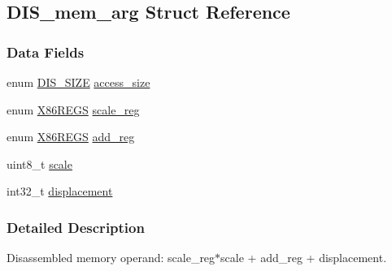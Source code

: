 \hypertarget{struct_d_i_s__mem__arg}{\subsection{D\-I\-S\-\_\-mem\-\_\-arg Struct Reference}
\label{struct_d_i_s__mem__arg}
}
\subsubsection*{Data Fields}
\begin{DoxyCompactItemize}
\item 
enum \hyperlink{bytecode__disasm_8h_a6a0d419b6b61630b1f76a25ff39df84d}{D\-I\-S\-\_\-\-S\-I\-Z\-E} \hyperlink{struct_d_i_s__mem__arg_abe85ed51a3596cdb3a868a284c3d961f}{access\-\_\-size}
\item 
enum \hyperlink{bytecode__disasm_8h_a87af2e927a80478796188d9d8d813d82}{X86\-R\-E\-G\-S} \hyperlink{struct_d_i_s__mem__arg_afb3d2d6aee6f877fd62b8ffc576d9351}{scale\-\_\-reg}
\item 
enum \hyperlink{bytecode__disasm_8h_a87af2e927a80478796188d9d8d813d82}{X86\-R\-E\-G\-S} \hyperlink{struct_d_i_s__mem__arg_abdbd08c3d265ff494ad5ff1006cc6a73}{add\-\_\-reg}
\item 
uint8\-\_\-t \hyperlink{struct_d_i_s__mem__arg_a616c0a72f0e4af38b93c736773ac7210}{scale}
\item 
int32\-\_\-t \hyperlink{struct_d_i_s__mem__arg_a241d2c58aca95f8589148d4acf97406d}{displacement}
\end{DoxyCompactItemize}


\subsubsection{Detailed Description}
Disassembled memory operand\-: scale\-\_\-reg$\ast$scale + add\-\_\-reg + displacement. 

